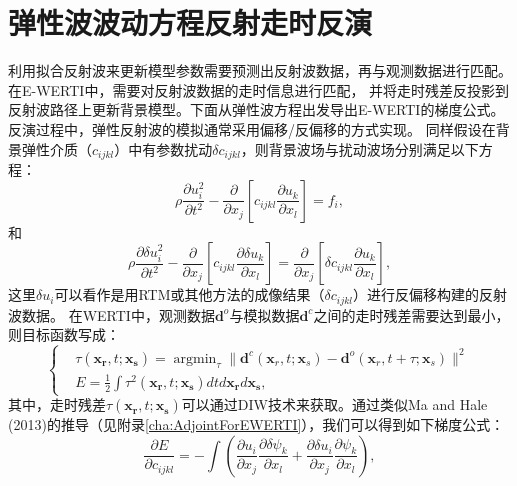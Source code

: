 \section{弹性波波动方程反射走时反演}
利用拟合反射波来更新模型参数需要预测出反射波数据，再与观测数据进行匹配。在E-WERTI中，需要对反射波数据的走时信息进行匹配，
并将走时残差反投影到反射波路径上更新背景模型。下面从弹性波方程出发导出E-WERTI的梯度公式。
反演过程中，弹性反射波的模拟通常采用偏移/反偏移的方式实现。
同样假设在背景弹性介质（$c_{ijkl}$）中有参数扰动$\delta c_{ijkl}$，则背景波场与扰动波场分别满足以下方程：
\begin{equation}
    \rho \frac{\partial u^2_i}{\partial t^2}  -
    \frac{\partial}{\partial x_j}\left[ 
        c_{ijkl}\frac{\partial u_{k}}{\partial
        x_l}\right]=f_i,
    \label{eq:WE_3} 
\end{equation}
和
\begin{equation}
    \rho \frac{\partial \delta u^2_i}{\partial t^2}  -
    \frac{\partial}{\partial x_j}\left[ 
        c_{ijkl}\frac{\partial \delta u_{k}}{\partial
        x_l}\right]=\frac{\partial}{\partial x_j}\left[\delta c_{ijkl}\frac{\partial u_{k}}{\partial x_l}\right],
    \label{eq:DeltaWE} 
\end{equation}
这里$\delta u_i$可以看作是用RTM或其他方法的成像结果（$\delta c_{ijkl}$）进行反偏移构建的反射波数据。
在WERTI中，观测数据$\mathbf{d}^{o}$与模拟数据$\mathbf{d}^{c}$之间的走时残差需要达到最小，则目标函数写成：
\begin{equation}
	\left\{
		\begin{aligned}
			&\tau(\mathbf{x_r},t;\mathbf{x_s})=\mathop{\arg\min}_{\tau}
			\parallel\mathbf{d}^{c}(\mathbf{x}_r,t;\mathbf{x}_s)-\mathbf{d}^{o}(\mathbf{x}_r,t+\tau;\mathbf{x}_s)\parallel^2\\
    &E=\frac{1}{2}\int\tau^2(\mathbf{x_r},t;\mathbf{x_s})dtd\mathbf{x_r}d\mathbf{x_s},
		\end{aligned}
	\right.
    \label{eq:Objectivefunction} 
\end{equation}
其中，走时残差$\tau(\mathbf{x_r},t;\mathbf{x_s})$可以通过DIW技术来获取。通过类似Ma and
Hale (2013)\cite{ma2013}的推导（见附录\ref{cha:AdjointForEWERTI}），我们可以得到如下梯度公式：
\begin{equation}
    \frac{\partial E}{\partial c_{ijkl}}=-\int (\frac{\partial u_{i}}{\partial
    x_j}\frac{\partial \delta \psi_{k}}{\partial x_l}+\frac{\partial \delta u_{i}}{\partial
    x_j}\frac{\partial \psi_{k}}{\partial x_l}),
    \label{eq:GradientCijkl}
\end{equation}
